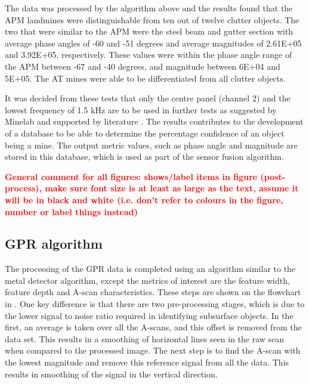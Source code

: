 \documentclass[main.tex]{subfiles}
\begin{document}
The data was processed by the algorithm above and the results found that the APM landmines were distinguishable from ten out of twelve clutter objects. The two that were similar to the APM were the steel beam and gutter section with average phase angles of -60 and -51 degrees and average magnitudes of 2.61E+05 and 3.92E+05, respectively. These values were within the phase angle range of the APM between -67 and -40 degrees, and magnitude between 6E+04 and 5E+05. The AT mines were able to be differentiated from all clutter objects. 

It was decided from these tests that only the centre panel (channel 2) and the lowest frequency of 1.5 kHz are to be used in further tests as suggested by Minelab and supported by literature \parencite{bruschini02}. The results contributes to the development of a database to be able to determine the percentage confidence of an object being a mine. The output metric values, such as phase angle and magnitude are stored in this database, which is used as part of the sensor fusion algorithm. 

\textcolor{red}{\textbf{General comment for all figures: shows/label items in figure (post-process), make sure font size is at least as large as the text, assume it will be in black and white (i.e. don't refer to colours in the figure, number or label things instead)}}

\subsection{GPR algorithm}
The processing of the GPR data is completed using an algorithm similar to the metal detector algorithm, except the metrics of interest are the feature width, feature depth and A-scan characteristics. These steps are shown on the flowchart in . One key difference is that there are two pre-processing stages, which is due to the lower signal to noise ratio required in identifying subsurface objects.  In the first, an average is taken over all the A-scans, and this offset is removed from the data set. This results in a smoothing of horizontal lines seen in the raw scan when compared to the processed image. The next step is to find the A-scan with the lowest magnitude and remove this reference signal from all the data. This results in smoothing of the signal in the vertical direction.
\end{document}
